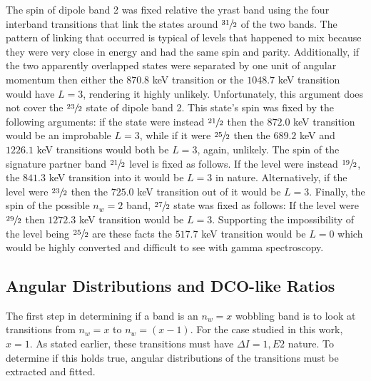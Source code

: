 The spin of dipole band 2 was fixed relative the yrast band using the four interband transitions that link the states around $\sfrac{31}{2}$ of the two bands. The pattern of linking that occurred is typical of levels that happened to mix because they were very close in energy and had the same spin and parity. Additionally, if the two apparently overlapped states were separated by one unit of angular momentum then either the $870.8$ keV transition or the $1048.7$ keV transition would have $L=3$, rendering it highly unlikely. Unfortunately, this argument does not cover the $\sfrac{23}{2}$ state of dipole band 2. This state's spin was fixed by the following arguments: if the state were instead $\sfrac{21}{2}$ then the $872.0$ keV transition would be an improbable $L=3$, while if it were $\sfrac{25}{2}$ then the $689.2$ keV and $1226.1$ keV transitions would both be $L=3$, again, unlikely. The spin of the signature partner band $\sfrac{21}{2}$ level is fixed as follows. If the level were instead $\sfrac{19}{2}$, the $841.3$ keV transition into it would be $L=3$ in nature. Alternatively, if the level were $\sfrac{23}{2}$ then the $725.0$ keV transition out of it would be $L=3$. Finally, the spin of the possible $n_w=2$ band, $\sfrac{27}{2}$ state was fixed as follows: If the level were $\sfrac{29}{2}$ then $1272.3$ keV transition would be $L=3$. Supporting the impossibility of the level being $\sfrac{25}{2}$ are these facts the $517.7$ keV transition would be $L=0$ which would be highly converted and difficult to see with gamma spectroscopy. %

\subsection{Angular Distributions and DCO-like Ratios}
\label{ssec:trw-lvl-angles}

The first step in determining if a band is an $n_w=x$ wobbling band is to look at transitions from $n_w=x$ to $n_w=(x-1)$. For the case studied in this work, $x=1$. As stated earlier, these transitions must have $\Delta{}I=1, E2$ nature. To determine if this holds true, angular distributions of the transitions must be extracted and fitted.

